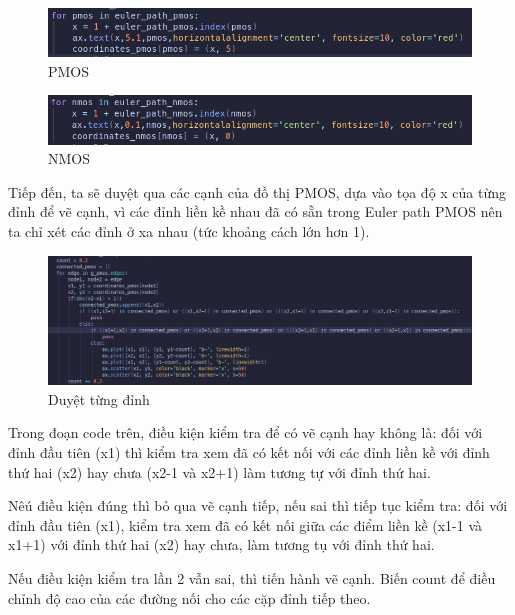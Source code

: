 \documentclass[a4paper,12pt]{article}
\begin{document}
\begin{figure}[H]
    \centering
    \includegraphics[width=1\textwidth]{../PNG/pmos.png}
    \caption{PMOS}
    \label{fig:pmos}
\end{figure}

\begin{figure}[H]
    \centering
    \includegraphics[width=1\textwidth]{../PNG/nmos.png}
    \caption{NMOS}
    \label{fig:nmos}
\end{figure}

Tiếp đến, ta sẽ duyệt qua các cạnh của đồ thị PMOS, dựa vào tọa độ x của từng đỉnh
để vẽ cạnh, vì các đỉnh liền kề nhau đã có sẵn trong Euler path PMOS nên ta chỉ 
xét các đỉnh ở xa nhau (tức khoảng cách lớn hơn 1).

\begin{figure}[H]
    \centering
    \includegraphics[width=1\textwidth]{../PNG/hehe.png}
    \caption{Duyệt từng đỉnh}
    \label{fig:hehe}
\end{figure}

Trong đoạn code trên, điều kiện kiểm tra để có vẽ cạnh hay không là: đối với đỉnh đầu tiên (x1) thì kiểm tra 
xem đã có kết nối với các đỉnh liền kề với đỉnh thứ hai (x2) hay chưa (x2-1 và x2+1) làm tương tự với đỉnh thứ hai.

Nêú điều kiện đúng thì bỏ qua vẽ cạnh tiếp, nếu sai thì tiếp tục kiểm tra:
đối với đỉnh đầu tiên (x1), kiểm tra xem đã có kết nối giữa các điểm liền kề (x1-1 và x1+1) 
với đỉnh thứ hai (x2) hay chưa, làm tương tụ với đỉnh thứ hai.

Nếu điều kiện kiểm tra lần 2 vẫn sai, thì tiến hành vẽ cạnh. Biến count để điều chỉnh độ cao của các đường nối cho các cặp đỉnh tiếp theo.
\end{document}
